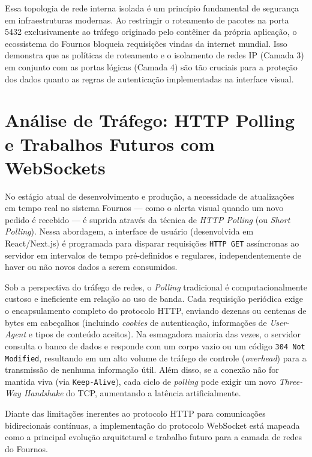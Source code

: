 \documentclass[12pt, a4paper]{article}
\begin{document}
Essa topologia de rede interna isolada é um princípio fundamental de segurança em infraestruturas modernas. Ao restringir o roteamento de pacotes na porta 5432 exclusivamente ao tráfego originado pelo contêiner da própria aplicação, o ecossistema do Fournos bloqueia requisições vindas da internet mundial. Isso demonstra que as políticas de roteamento e o isolamento de redes IP (Camada 3) em conjunto com as portas lógicas (Camada 4) são tão cruciais para a proteção dos dados quanto as regras de autenticação implementadas na interface visual.

\section{Análise de Tráfego: HTTP Polling e Trabalhos Futuros com WebSockets}

No estágio atual de desenvolvimento e produção, a necessidade de atualizações em tempo real no sistema Fournos --- como o alerta visual quando um novo pedido é recebido --- é suprida através da técnica de \textit{HTTP Polling} (ou \textit{Short Polling}). Nessa abordagem, a interface de usuário (desenvolvida em React/Next.js) é programada para disparar requisições \texttt{HTTP GET} assíncronas ao servidor em intervalos de tempo pré-definidos e regulares, independentemente de haver ou não novos dados a serem consumidos.

Sob a perspectiva do tráfego de redes, o \textit{Polling} tradicional é computacionalmente custoso e ineficiente em relação ao uso de banda. Cada requisição periódica exige o encapsulamento completo do protocolo HTTP, enviando dezenas ou centenas de bytes em cabeçalhos (incluindo \textit{cookies} de autenticação, informações de \textit{User-Agent} e tipos de conteúdo aceitos). Na esmagadora maioria das vezes, o servidor consulta o banco de dados e responde com um corpo vazio ou um código \texttt{304 Not Modified}, resultando em um alto volume de tráfego de controle (\textit{overhead}) para a transmissão de nenhuma informação útil. Além disso, se a conexão não for mantida viva (via \texttt{Keep-Alive}), cada ciclo de \textit{polling} pode exigir um novo \textit{Three-Way Handshake} do TCP, aumentando a latência artificialmente.

Diante das limitações inerentes ao protocolo HTTP para comunicações bidirecionais contínuas, a implementação do protocolo WebSocket \cite{rfc6455} está mapeada como a principal evolução arquitetural e trabalho futuro para a camada de redes do Fournos. 
\end{document}
